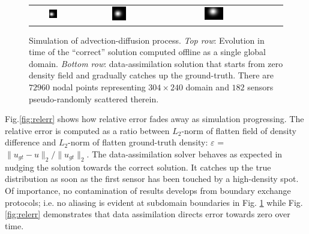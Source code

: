 \documentclass[acmsmall,review,anonymous]{acmart}\settopmatter{printfolios=true,printccs=false,printacmref=false}
\begin{document}
\begin{figure}[!ht]
\begin{tabular}{ccccc}
\includegraphics[width=0.19\textwidth]{images/field-t=1232} & 
\includegraphics[width=0.19\textwidth]{images/field-t=3006} &
\includegraphics[width=0.19\textwidth]{images/field-t=4089} 
\end{tabular}
\caption{Simulation of advection-diffusion process. \textit{Top row}: Evolution in time of the ``correct'' solution computed offline as a single global domain. \textit{Bottom row}: data-assimilation solution that starts from zero density field and gradually catches up the ground-truth. There are $72960$ nodal points representing $304{\times}240$ domain and $182$ sensors pseudo-randomly scattered therein.}
\label{fig:density}
\end{figure}

Fig.\ref{fig:relerr} shows how relative error fades away as simulation progressing. The relative error is computed as a ratio between $L_2$-norm of flatten field of density difference and  $L_2$-norm of flatten ground-truth density: $\varepsilon$ = $\|u_{gt} - u\|_2/\|u_{gt}\|_2$. The data-assimilation solver behaves as expected in nudging the solution towards the correct solution. It catches up the true distribution as soon as the first sensor has been touched by a high-density spot. Of importance, no contamination of results develops from boundary exchange protocols; i.e.  no aliasing is evident at subdomain boundaries in Fig. \ref{fig:density} while Fig. \ref{fig:relerr} demonstrates that data assimilation directs error towards zero over time. 
\end{document}
